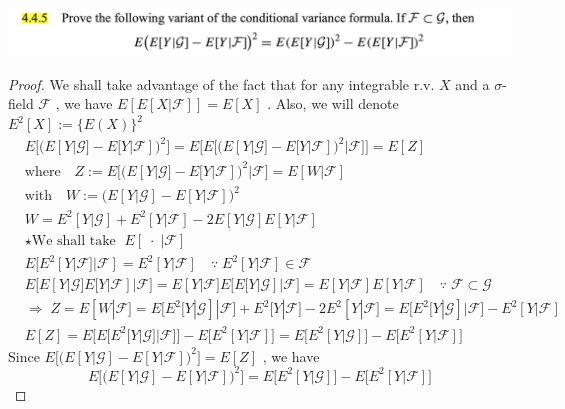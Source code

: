 \documentclass[12pt, A4]{article}
\newcommand{\G}{\mathcal{G}}
\newcommand{\F}{\mathcal{F}}
\begin{document}
\includegraphics[width=17cm]{Exer4.4.5.png}
\begin{proof}
    We shall take advantage of the fact that for any integrable r.v. $X$ and a $\sigma$-field $\F$ , we have $E[E[X|\F]]=E[X]$ . Also, we will denote $E^2[X]:=\{E(X)\}^2$
    \begin{align*}
        &E\big[\big(E[Y|\G]-E[Y|\F] \big)^2\big] = E\Big[E\big[\big(E[Y|\G]-E[Y|\F] \big)^2 |\F\big]\Big]=E[Z] \\ &\text{where}\quad Z:=E\big[\big(E[Y|\G]-E[Y|\F] \big)^2 |\F\big]=E[W|\F] \\ &\text{with} \quad W:=\big(E[Y|\G]-E[Y|\F] \big)^2\\
        &W=E^2[Y|\G]+E^2[Y|\F]-2E[Y|\G]E[Y|\F] \\
        &\star \text{We shall take }\; E[\;\cdot\;|\F]\\
        &E[E^2[Y|\F]|\F]=E^2[Y|\F]\quad \because\; E^2[Y|\F]\in \F \\
        &E\big[E[Y|\G]E[Y|\F]|\F\big]=E[Y|\F]E\big[E[Y|\G]|\F\big] = E[Y|\F]E[Y|\F] \quad \because\; \F\subset \G \\
        &\Rightarrow\; Z=E[W|\F]= E\big[E^2[Y|\G]|\F \big]+E^2[Y|\F]-2E^2[Y|\F]=E\big[E^2[Y|\G]|\F \big]-E^2[Y|\F] \\
        &E[Z] = E\Big[E\big[E^2[Y|\G]|\F \big]\Big]-E\big[E^2[Y|\F]\big]=E\big[E^2[Y|\G]\big] -E\big[E^2[Y|\F] \big]
    \end{align*}
    Since $E\big[\big(E[Y|\G]-E[Y|\F] \big)^2\big]=E[Z]$ , we have $$E\big[\big(E[Y|\G]-E[Y|\F] \big)^2\big]=E\big[E^2[Y|\G]\big] -E\big[E^2[Y|\F] \big]$$
\end{proof}
\vspace{1cm}
\end{document}
